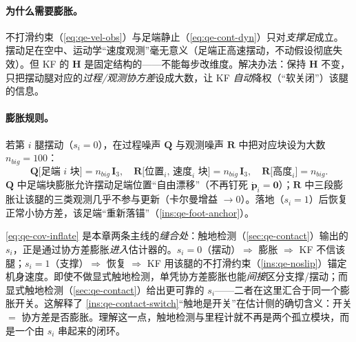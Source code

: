 \paragraph{为什么需要膨胀。}
不打滑约束（\cref{eq:qe-vel-obs}）与足端静止（\cref{eq:qe-cont-dyn}）只对\emph{支撑足}成立。摆动足在空中、运动学“速度观测”毫无意义（足端正高速摆动，不动假设彻底失效）。但 KF 的 $\mathbf{H}$ 是固定结构的——不能每步改维度。解决办法：保持 $\mathbf{H}$ 不变，只把摆动腿对应的\emph{过程/观测协方差}设成大数，让 KF \emph{自动}降权（“软关闭”）该腿的信息\cite{yu2021quadruped}。

\paragraph{膨胀规则。}
若第 $i$ 腿摆动（$s_i=0$），在过程噪声 $\mathbf{Q}$ 与观测噪声 $\mathbf{R}$ 中把对应块设为大数 $n_{big}=100$\cite{yu2021quadruped}：
\begin{equation}
  \mathbf{Q}\big[\text{足端 }i\text{ 块}\big]=n_{big}\,\mathbf{I}_3,
  \quad
  \mathbf{R}\big[\text{位置}_i,\,\text{速度}_i\text{ 块}\big]=n_{big}\,\mathbf{I}_3,
  \quad
  \mathbf{R}\big[\text{高度}_i\big]=n_{big}.
  \label{eq:qe-cov-inflate}
\end{equation}
$\mathbf{Q}$ 中足端块膨胀允许摆动足端位置“自由漂移”（不再钉死 $\dot{\boldsymbol p}_i=\boldsymbol 0$）；$\mathbf{R}$ 中三段膨胀让该腿的三类观测几乎不参与更新（卡尔曼增益 $\to0$）。落地（$s_i=1$）后恢复正常小协方差，该足端“重新落锚”（\cref{ins:qe-foot-anchor}）。

\begin{insight}[协方差膨胀 $=$ 触地检测在滤波器里的落地点（耦合 §触地 $\leftrightarrow$ §里程计）]\label{ins:qe-cov-couple}
\cref{eq:qe-cov-inflate} 是本章两条主线的\emph{缝合处}：触地检测（\cref{sec:qe-contact}）输出的 $s_i$，正是通过协方差膨胀\emph{进入}估计器的。$s_i=0$（摆动）$\Rightarrow$ 膨胀 $\Rightarrow$ KF 不信该腿；$s_i=1$（支撑）$\Rightarrow$ 恢复 $\Rightarrow$ KF 用该腿的不打滑约束（\cref{ins:qe-noslip}）锚定机身速度。即使不做显式触地检测，单凭协方差膨胀也能\emph{间接}区分支撑/摆动；而显式触地检测（\cref{sec:qe-contact}）给出更可靠的 $s_i$——二者在这里汇合于同一个膨胀开关。这解释了 \cref{ins:qe-contact-switch}“触地是开关”在估计侧的确切含义：开关 $=$ 协方差是否膨胀。理解这一点，触地检测与里程计就不再是两个孤立模块，而是一个由 $s_i$ 串起来的闭环。
\end{insight}

